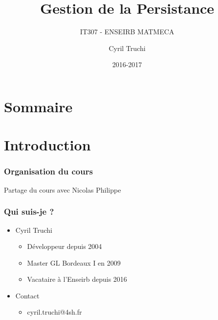 \documentclass[t,12pt]{beamer}
\title{Gestion de la Persistance}
\subtitle{IT307 - ENSEIRB MATMECA}
\author{Cyril Truchi}
\date{2016-2017}
\begin{document}
\frame{\titlepage}

\section*{Sommaire}
\begin{frame}
	\tableofcontents
\end{frame}

\section{Introduction}

\begin{frame}
	\frametitle{Organisation du cours}

	Partage du cours avec Nicolas Philippe
\end{frame}

\begin{frame}
	\frametitle{Qui suis-je ?}
	
	\begin{itemize}
		\item Cyril Truchi
			\begin{itemize}
				\item D\'eveloppeur depuis 2004
				\item Master GL Bordeaux I en 2009
				\item Vacataire \`a l'Enseirb depuis 2016
			\end{itemize}
		\item Contact
			\begin{itemize}
				\item cyril.truchi@4sh.fr
			\end{itemize}
	\end{itemize}
\end{frame}
\end{document}
